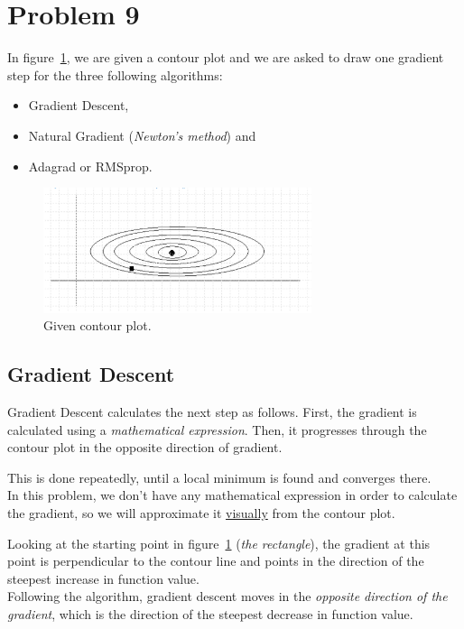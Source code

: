 \section{Problem 9}

In figure~\ref{fig:prob9_given_contour_plot}, we are given a contour plot and we are asked to draw one gradient step for the three following algorithms:
\begin{itemize}
	\item Gradient Descent,
	\item Natural Gradient (\textit{Newton's method}) and
	\item Adagrad or RMSprop.
\end{itemize}

\begin{figure}[htpb]
	\centering
	\includegraphics[width=0.7\textwidth]{../Problem 9/contour_plot.png}
	\caption{Given contour plot.}
	\label{fig:prob9_given_contour_plot}
\end{figure}

\subsection{Gradient Descent}

Gradient Descent calculates the next step as follows. First, the gradient is calculated using a \textit{mathematical expression}. Then, it progresses through the contour plot in the opposite direction of gradient.

This is done repeatedly, until a local minimum is found and converges there.\\

In this problem, we don't have any mathematical expression in order to calculate the gradient, so we will approximate it \underline{visually} from the contour plot.

Looking at the starting point in figure~\ref{fig:prob9_given_contour_plot} (\textit{the rectangle}), 
the gradient at this point is perpendicular to the contour line and points in the direction of the steepest increase in function value.\\
Following the algorithm, gradient descent moves in the \textit{opposite direction of the gradient}, which is the direction of the steepest decrease in function value.

